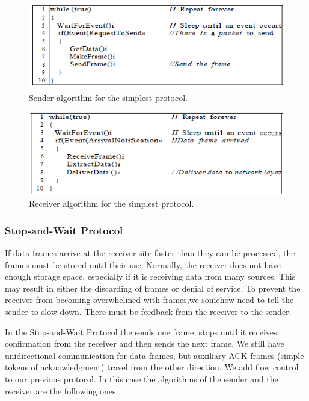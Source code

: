 \begin{figure}[H]
\begin{center}
\includegraphics[scale=1]{simplestsender.PNG}
\caption{Sender algorithm for the simplest protocol.}
\end{center}
\end{figure}

\begin{figure}[H]
\begin{center}
\includegraphics[scale=1]{simplestreceiver.PNG}
\caption{Receiver algorithm for the simplest protocol.}
\end{center}
\end{figure}

\subsubsection{Stop-and-Wait Protocol}
If data frames arrive at the receiver site faster than they can be processed, the frames must be stored until their use. Normally, the receiver does not have enough storage space, especially if it is receiving data from many sources. This may result in either the discarding of frames or denial of service. To prevent the receiver from becoming overwhelmed with frames,we somehow need to tell the sender to slow down. There must be
feedback from the receiver to the sender.

In the Stop-and-Wait Protocol the sends one frame, stops until it receives confirmation from the receiver and then sends the next frame. We still have unidirectional communication for data frames, but auxiliary ACK frames (simple tokens of acknowledgment) travel from the other direction. We add flow control to our previous protocol. In this case the algorithms of the sender and the receiver are the following ones.

